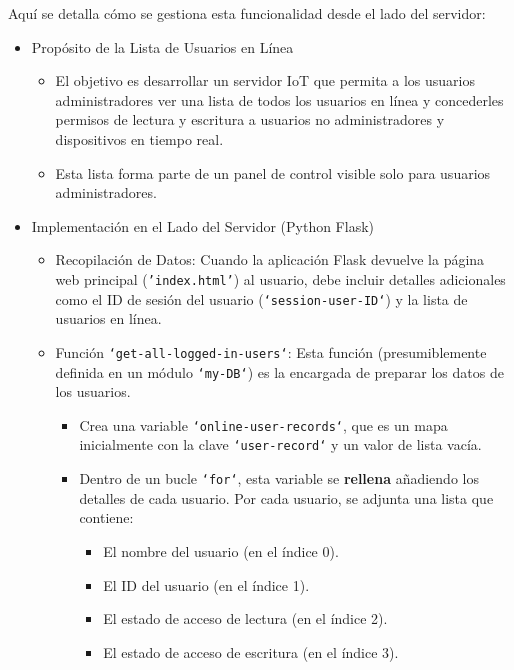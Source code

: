 \documentclass{report}
\begin{document}
Aquí se detalla cómo se gestiona esta funcionalidad desde el lado del servidor:
\begin{itemize}
    \item Propósito de la Lista de Usuarios en Línea
        \begin{itemize}
            \item El objetivo es desarrollar un servidor IoT que permita a los usuarios administradores ver una lista de todos los usuarios en 
            línea y concederles permisos de lectura y escritura a usuarios no administradores y dispositivos en tiempo real.
            \item Esta lista forma parte de un panel de control visible solo para usuarios administradores.
        \end{itemize}

    \item Implementación en el Lado del Servidor (Python Flask)
        \begin{itemize}
            \item Recopilación de Datos: Cuando la aplicación Flask devuelve la página web principal (\texttt{'index.html'}) al usuario, debe incluir 
            detalles adicionales como el ID de sesión del usuario (\texttt{`session-user-ID`}) y la lista de usuarios en línea.
            \item Función \texttt{`get-all-logged-in-users`}: Esta función (presumiblemente definida en un módulo \texttt{`my-DB`}) es la encargada de 
            preparar los datos de los usuarios.
                \begin{itemize}
                    \item Crea una variable \texttt{`online-user-records`}, que es un mapa inicialmente con la clave \texttt{`user-record`} y un valor de 
                    lista vacía.
                    \item Dentro de un bucle \texttt{`for`}, esta variable se \textbf{rellena} añadiendo los detalles de cada usuario. Por cada usuario, se 
                    adjunta una lista que contiene:
                        \begin{itemize}
                            \item El nombre del usuario (en el índice 0).
                            \item El ID del usuario (en el índice 1).
                            \item El estado de acceso de lectura (en el índice 2).
                            \item El estado de acceso de escritura (en el índice 3).                        

\end{itemize}
\end{itemize}
\end{itemize}
\end{itemize}
\end{document}
